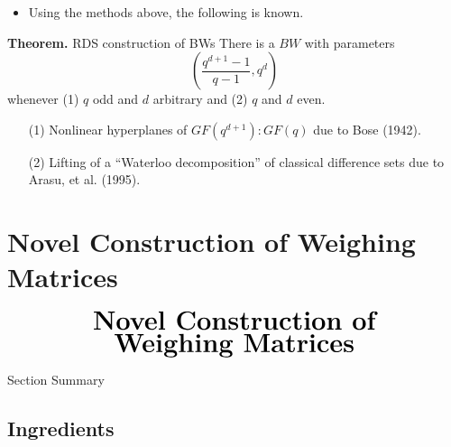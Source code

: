 \documentclass{beamer}
\begin{document}
\begin{frame}

  \begin{itemize}
  \item Using the methods above, the following is known.
  \end{itemize}

  \begin{block}{{\bf Theorem.} RDS construction of BWs}
    There is a $BW$ with parameters
    \[
      \left(
        \frac{q^{d+1}-1}{q-1}, q^d
      \right)
    \]
    whenever (1) $q$ odd and $d$ arbitrary and (2) $q$ and $d$ even.
  \end{block}

  \begin{itemize}
  \item[(1)] Nonlinear hyperplanes of $GF(q^{d+1}) : GF(q)$ due to Bose (1942).
  \item[(2)] Lifting of a ``Waterloo decomposition'' of classical difference
    sets due to Arasu, et al. (1995).
  \end{itemize}

\end{frame}


\section{Novel Construction of Weighing Matrices}

\begin{frame}
  \[
    \begin{array}{c}
      \text{\huge\bf Novel Construction of}
      \\
      \text{\huge\bf Weighing Matrices}
    \end{array}
  \]
\end{frame}

\begin{frame}{Section Summary}
  \tableofcontents[sections={2}]
\end{frame}


\subsection{Ingredients}
\end{document}
